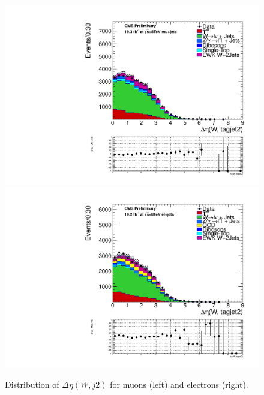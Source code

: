 
\begin{figure}[ht]
\centerline{
\includegraphics[width=.49\textwidth]{figs/n-1_plots_mu/mu_EWK_W_2jets_W_tagjet2_deltaeta_mjj_600_tagjet1_60_tagjet2_50_Zeppenfield_1point2_EWKW2jets.pdf}
\includegraphics[width=.49\textwidth]{figs/n-1_plots_el/el_EWK_W_2jets_W_tagjet2_deltaeta_mjj_600_tagjet1_60_tagjet2_50_Zeppenfield_1point2_met_30_WmT_30_EWKW2jets.pdf}
}
\caption{Distribution of $\Delta \eta(W,j2)$ for muons (left) and electrons (right).}
\label{fig:deltaetawj2}
\end{figure}

